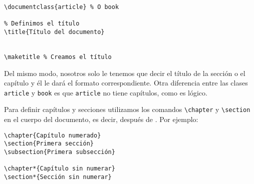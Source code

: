 \begin{lstlisting}[language={[latex]tex}]
\documentclass{article} % O book

% Definimos el título
\title{Título del documento}


\maketitle % Creamos el título

\end{lstlisting}

Del mismo modo, nosotros solo le tenemos que decir el título de la
sección o el capítulo y él le dará el formato correspondiente. Otra
diferencia entre las clases \lstinline!article! y \lstinline!book! es
que \lstinline!article! no tiene capítulos, como es lógico.

Para definir capítulos y secciones utilizamos los comandos
\lstinline!\chapter! y \lstinline!\section! en el cuerpo del documento,
es decir, después de \lstinline!!. Por ejemplo:

\begin{lstlisting}[language={[latex]tex}]
\chapter{Capítulo numerado}
\section{Primera sección}
\subsection{Primera subsección}

\chapter*{Capítulo sin numerar}
\section*{Sección sin numerar}
\end{lstlisting}

